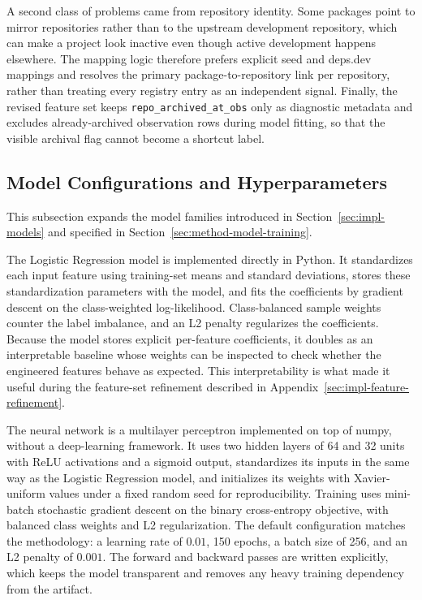 A second class of problems came from repository identity. Some packages point to mirror repositories rather than to the upstream development repository, which can make a project look inactive even though active development happens elsewhere. The mapping logic therefore prefers explicit seed and deps.dev mappings and resolves the primary package-to-repository link per repository, rather than treating every registry entry as an independent signal. Finally, the revised feature set keeps \texttt{repo\_archived\_at\_obs} only as diagnostic metadata and excludes already-archived observation rows during model fitting, so that the visible archival flag cannot become a shortcut label.

\subsection{Model Configurations and Hyperparameters}
\label{sec:impl-from-scratch}

This subsection expands the model families introduced in Section~\ref{sec:impl-models} and specified in Section~\ref{sec:method-model-training}.

The Logistic Regression model is implemented directly in Python. It standardizes each input feature using training-set means and standard deviations, stores these standardization parameters with the model, and fits the coefficients by gradient descent on the class-weighted log-likelihood. Class-balanced sample weights counter the label imbalance, and an L2 penalty regularizes the coefficients. Because the model stores explicit per-feature coefficients, it doubles as an interpretable baseline whose weights can be inspected to check whether the engineered features behave as expected. This interpretability is what made it useful during the feature-set refinement described in Appendix~\ref{sec:impl-feature-refinement}.

The neural network is a multilayer perceptron implemented on top of numpy, without a deep-learning framework. It uses two hidden layers of 64 and 32 units with ReLU activations and a sigmoid output, standardizes its inputs in the same way as the Logistic Regression model, and initializes its weights with Xavier-uniform values under a fixed random seed for reproducibility. Training uses mini-batch stochastic gradient descent on the binary cross-entropy objective, with balanced class weights and L2 regularization. The default configuration matches the methodology: a learning rate of \(0.01\), 150 epochs, a batch size of 256, and an L2 penalty of \(0.001\). The forward and backward passes are written explicitly, which keeps the model transparent and removes any heavy training dependency from the artifact.

